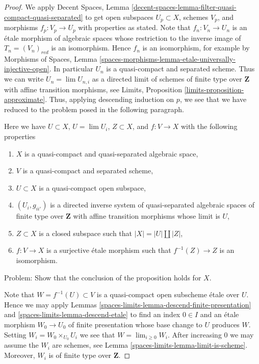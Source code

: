 \begin{proof}
We apply Decent Spaces, Lemma
\ref{decent-spaces-lemma-filter-quasi-compact-quasi-separated}
to get open subspaces $U_p \subset X$, schemes $V_p$, and morphisms
$f_p : V_p \to U_p$ with properties as stated. Note that
$f_n : V_n \to U_n$ is an \'etale morphism of algebraic spaces
whose restriction to the inverse image of $T_n = (V_n)_{red}$ is an
isomorphism. Hence $f_n$ is an isomorphism, for example by
Morphisms of Spaces, Lemma
\ref{spaces-morphisms-lemma-etale-universally-injective-open}.
In particular $U_n$ is a quasi-compact and separated scheme.
Thus we can write $U_n = \lim U_{n, i}$ as a directed limit
of schemes of finite type over $\mathbf{Z}$ with affine transition
morphisms, see Limits, Proposition \ref{limits-proposition-approximate}.
Thus, applying descending induction on $p$, we see that we have reduced
to the problem posed in the following paragraph.

\medskip\noindent
Here we have $U \subset X$, $U = \lim U_i$, $Z \subset X$, and
$f : V \to X$ with the following properties
\begin{enumerate}
\item $X$ is a quasi-compact and quasi-separated algebraic space,
\item $V$ is a quasi-compact and separated scheme,
\item $U \subset X$ is a quasi-compact open subspace,
\item $(U_i, g_{ii'})$ is a directed inverse system of
quasi-separated algebraic spaces
of finite type over $\mathbf{Z}$ with affine transition morphisms
whose limit is $U$,
\item $Z \subset X$ is a closed subspace such that $|X| = |U| \amalg |Z|$,
\item $f : V \to X$ is a surjective \'etale morphism such that
$f^{-1}(Z) \to Z$ is an isomorphism.
\end{enumerate}
Problem: Show that the conclusion of the proposition holds for $X$.

\medskip\noindent
Note that $W = f^{-1}(U) \subset V$ is a quasi-compact open subscheme
\'etale over $U$. Hence we may apply
Lemmas \ref{spaces-limits-lemma-descend-finite-presentation} and \ref{spaces-limits-lemma-descend-etale}
to find an index $0 \in I$ and an \'etale morphism $W_0 \to U_0$
of finite presentation whose base change to $U$ produces $W$. Setting
$W_i = W_0 \times_{U_0} U_i$ we see that $W = \lim_{i \geq 0} W_i$. After
increasing $0$ we may assume the $W_i$ are schemes, see
Lemma \ref{spaces-limits-lemma-limit-is-scheme}.
Moreover, $W_i$ is of finite type over $\mathbf{Z}$.


\end{proof}

